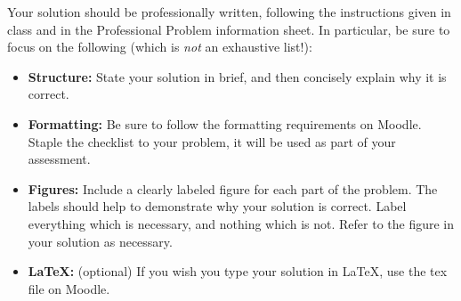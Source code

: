 \documentclass{ximera}
\begin{document}
\begin{problem}
Your solution should be professionally written, following the instructions given in class and in the Professional Problem information sheet. In particular, be sure to focus on the following (which is \emph{not} an exhaustive list!):
\begin{itemize}
	\item \textbf{Structure:} State your solution in brief, and then concisely explain why it is correct.
	\item \textbf{Formatting:} Be sure to follow the formatting requirements on Moodle. Staple the checklist to your problem, it will be used as part of your assessment.
	\item \textbf{Figures:} Include a clearly labeled figure for each part of the problem. The labels should help to demonstrate why your solution is correct. Label everything which is necessary, and nothing which is not. Refer to the figure in your solution as necessary.
	\item \textbf{\LaTeX:} (optional) If you wish you type your solution in \LaTeX, use the tex file on Moodle.
\end{itemize}
\end{problem}
\end{document}
